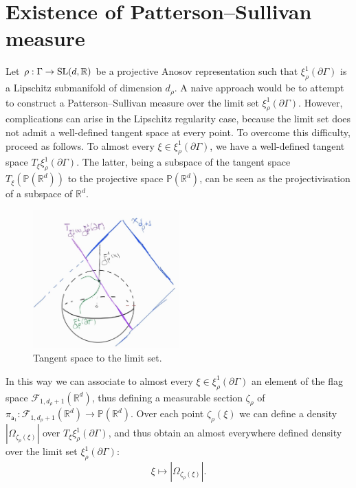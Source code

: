 \documentclass{report}
\begin{document}
\section{Existence of Patterson--Sullivan measure}\label{sec:MeasureExistence}
Let $\rho:\Gamma \to \operatorname{{\mathrm{SL}}}(d, \mathbb R)$ be a projective Anosov representation such that $\xi^1_\rho(\partial \Gamma)$ is a Lipschitz submanifold of dimension $d_\rho$.
A naive approach would be to attempt to construct a Patterson--Sullivan measure over the limit set $\xi^1_\rho(\partial \Gamma)$.
However, complications can arise in the Lipschitz regularity case, because the limit set does not admit a well-defined tangent space at every point.
To overcome this difficulty, proceed as follows.
To almost every $\xi \in \xi_\rho^1(\partial \Gamma)$, we have a well-defined tangent space $T_\xi \xi_\rho^1(\partial \Gamma)$.
The latter, being a subspace of the tangent space $T_\xi(\mathbb P(\mathbb R^d))$ to the projective space $\mathbb P(\mathbb R^d)$, can be seen as the projectivisation of a subspace of $\mathbb R^d$.
\begin{figure}[h]
    \centering
    \includegraphics[width=0.5\textwidth]{tangent space.jpg}
    \caption{Tangent space to the limit set.}
    \label{fig:tangent_space}
\end{figure}
In this way we can associate to almost every $\xi \in \xi_\rho^1(\partial \Gamma)$ an element of the flag space $\mathcal F_{1, d_\rho + 1}(\mathbb R^d)$, thus defining a measurable section $\zeta_\rho$ of $\pi_{\mathsf{a}_1}: \mathcal F_{1, d_\rho + 1}(\mathbb R^d) \to \mathbb P(\mathbb R^d)$.
Over each point $\zeta_\rho(\xi)$ we can define a density $|\Omega_{\zeta_\rho(\xi)}|$ over $T_{\xi} \xi_\rho^1(\partial \Gamma)$, and thus obtain an almost everywhere defined density over the limit set $\xi_\rho^1(\partial \Gamma)$:
\[
    \xi \mapsto \left|\Omega_{\zeta_\rho(\xi)}\right|.
\]
\end{document}
